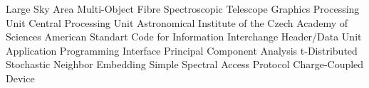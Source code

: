   {Large Sky Area Multi-Object Fibre Spectroscopic Telescope}
     {Graphics Processing Unit}
     {Central Processing Unit}
 {Astronomical Institute of the Czech Academy of Sciences}
   {American Standart Code for Information Interchange}
     {Header/Data Unit}
     {Application Programming Interface}
     {Principal Component Analysis}
   {t-Distributed Stochastic Neighbor Embedding}
    {Simple Spectral Access Protocol}
     {Charge-Coupled Device}
